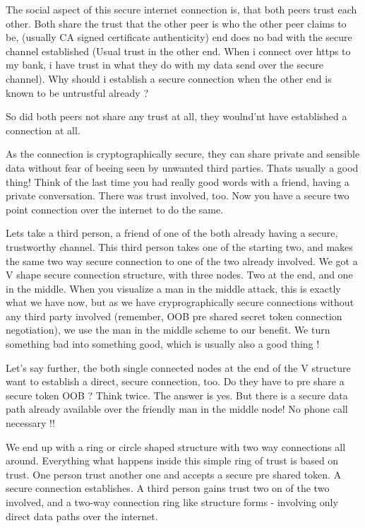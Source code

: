 The social aspect of this secure internet connection is, that both
peers trust each other. Both share the trust that the other peer is
who the other peer claims to be, (usually CA signed certificate
authenticity) end does no bad with the secure channel established
(Usual trust in the other end. When i connect over https to my bank, i
have trust in what they do with my data send over the secure
channel). Why should i establish a secure connection when the other
end is known to be untrustful already ?

So did both peers not share any trust at all, they woulnd'nt have
established a connection at all.

As the connection is cryptographically secure, they can share private
and sensible data without fear of beeing seen by unwanted third
parties. Thats usually a good thing! Think of the last time you had
really good words with a friend, having a private conversation. There
was trust involved, too. Now you have a secure two point connection
over the internet to do the same.

Lets take a third person, a friend of one of the both already having a
secure, trustworthy channel. This third person takes one of the
starting two, and makes the same two way secure connection to one of
the two already involved. We got a V shape secure connection
structure, with three nodes. Two at the end, and one in the
middle. When you visualize a man in the middle attack, this is exactly
what we have now, but as we have cryprographically secure connections
without any third party involved (remember, OOB pre shared secret
token connection negotiation), we use the man in the middle scheme to
our benefit. We turn something bad into something good, which is
usually also a good thing !

Let's say further, the both single connected nodes at the end of the V
structure want to establish a direct, secure connection, too. Do they
have to pre share a secure token OOB ? Think twice. The answer is
yes. But there is a secure data path already available over the
friendly man in the middle node! No phone call necessary !!

We end up with a ring or circle shaped structure with two way
connections all around. Everything what happens inside this simple
ring of trust is based on trust. One person trust another one and
accepts a secure pre shared token. A secure connection establishes. A
third person gains trust two on of the two involved, and a two-way
connection ring like structure forms - involving only direct data
paths over the internet.

